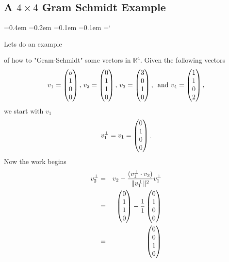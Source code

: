 \subsection*{A $4\times4$ Gram Schmidt Example}

{\ttfamily
{}\font=0.4em
\font=0.2em
\font=0.1em
\font=0.1em
\hyphenchar\font=`\-


\hypertarget{scripts_gram_schmidt_and_orthogonal_complements_4by4_example}{Lets do an example} of how to "Gram-Schmidt" some vectors in $\mathbb{R}^4$. Given the following vectors
\[
v_1 = \begin{pmatrix} o\\1 \\ 0\\ 0 \end{pmatrix}, \, v_2 = \begin{pmatrix} 0\\1\\ 1\\ 0 \end{pmatrix}, \, v_3 = \begin{pmatrix} 3\\0 \\ 1\\ 0 \end{pmatrix}, \, \text{ and } v_4 = \begin{pmatrix} 1\\ 1\\ 0\\2 \end{pmatrix},
\]
we start with $v_1$
\[
v_1^\bot = v_1 =\begin{pmatrix} 0\\1 \\ 0\\ 0 \end{pmatrix}.
\]
Now the work begins
\begin{eqnarray*}
v_2^\bot &=& v_2 -\frac{(v_1^\bot \cdot v_2) }{\|v_1^\bot\|^2} v_1^\bot \\
&=&\begin{pmatrix} 0\\1\\ 1\\ 0 \end{pmatrix} - \frac{1}{1}  \begin{pmatrix} 0\\1 \\ 0\\ 0 \end{pmatrix}\\
&=&  \begin{pmatrix} 0\\0\\ 1\\ 0 \end{pmatrix}  \\
\end{eqnarray*}


}
